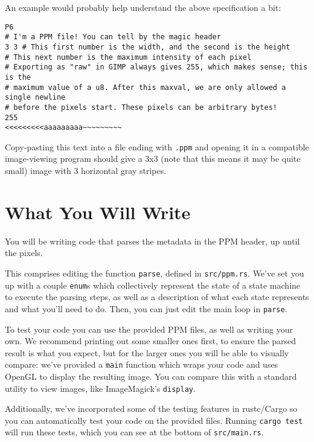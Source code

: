 \documentclass{article}
\begin{document}
An example would probably help understand the above specification a bit:

\begin{verbatim}
P6
# I'm a PPM file! You can tell by the magic header
3 3 # This first number is the width, and the second is the height
# This next number is the maximum intensity of each pixel
# Exporting as "raw" in GIMP always gives 255, which makes sense; this is the
# maximum value of a u8. After this maxval, we are only allowed a single newline
# before the pixels start. These pixels can be arbitrary bytes!
255
<<<<<<<<<aaaaaaaaa~~~~~~~~~
\end{verbatim}

Copy-pasting this text into a file ending with \texttt{.ppm} and opening it in a compatible image-viewing program should give a 3x3 (note that this means it may be quite small) image with 3 horizontal gray stripes.

\section*{What You Will Write}

You will be writing code that parses the metadata in the PPM header, up until the pixels.

This comprises editing the function \texttt{parse}, defined in \texttt{src/ppm.rs}. We've set you up with a couple \texttt{enum}s which collectively represent the state of a state machine to execute the parsing steps, as well as a description of what each state represents and what you'll need to do. Then, you can just edit the main loop in \texttt{parse}.

To test your code you can use the provided PPM files, as well as writing your own. We recommend printing out some smaller ones first, to ensure the parsed result is what you expect, but for the larger ones you will be able to visually compare: we've provided a \texttt{main} function which wraps your code and uses OpenGL to display the resulting image. You can compare this with a standard utility to view images, like ImageMagick's \texttt{display}.

Additionally, we've incorporated some of the testing features in rustc/Cargo so you can automatically test your code on the provided files. Running \texttt{cargo test} will run these tests, which you can see at the bottom of \texttt{src/main.rs}.
\end{document}
